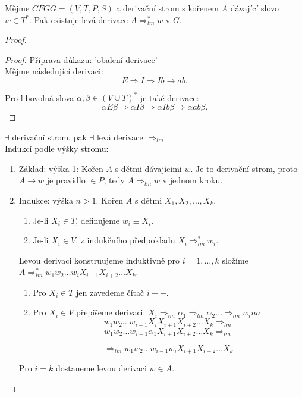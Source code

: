 \documentclass[../main.tex]{subfiles}
\begin{document}
\begin{theorem}
    Mějme $CFG G = (V,T,P,S)$ a derivační strom s kořenem $A$ dávající slovo $w \in T^*$. Pak existuje
    levá derivace $A \Rightarrow^*_{lm} w $ v $G$.

    \begin{proof}

        
        \begin{proof}
        Příprava důkazu: 'obalení derivace'\\

        Mějme následující derivaci:
        \[E \Rightarrow I \Rightarrow Ib \rightarrow ab.\]

        Pro libovolná slova $\alpha, \beta \in (V\cup T)^*$ je také derivace:
        \[\alpha E \beta \Rightarrow \alpha I \beta \Rightarrow \alpha Ib \beta \Rightarrow \alpha ab \beta.\]
        \end{proof}

        $\exists$ derivační strom, pak $\exists$ levá derivace $\Rightarrow_{lm}$\\

        Indukcí podle výšky stromu:
        \begin{enumerate}
            \item Základ: výška 1: Kořen $A$ s dětmi dávajícimi $w$. Je to derivační strom, proto
            $A \rightarrow w$ je pravidlo $\in P$, tedy $A \Rightarrow_{lm} w$ v jednom kroku.
            \item Indukce: výška $n > 1$. Kořen $A$ s dětmi $X_1,X_2,\dots,X_k$.
            \begin{enumerate}
                \item Je-li $X_i \in T$, definujeme $w_i \equiv X_i$.
                \item Je-li $X_i \in V$, z indukčního předpokladu $X_i \Rightarrow^*_{lm}w_i$.
            \end{enumerate}

            Levou derivaci konstruujeme induktivně pro $i = 1,\dots,k$ složíme $A \Rightarrow^*_{lm}w_1w_2 \dots w_i X_{i+1}X_{i+2}\dots X_k$.
            \begin{enumerate}
                \item Pro $X_i \in T$ jen zavedeme čítač $i + +$.
                \item Pro $X_i \in V$ přepíšeme derivaci: $X_i\Rightarrow_{lm} \alpha_1 \Rightarrow_{lm} \alpha_2\dots \Rightarrow_{lm}w_i na$
                \[w_1w_2\dots w_{i-1}X_iX_{i+1}X_{i+2}\dots X_k \Rightarrow_{lm}\]
                \[w_1w_2\dots w_{i-1}\alpha_1X_{i+1}X_{i+2}\dots X_k \Rightarrow_{lm}\]


                \[\Rightarrow_{lm} w_1w_2\dots w_{i-1}w_i X_{i+1}X_{i+2}\dots X_k\]                
            \end{enumerate}

            Pro $i = k$ dostaneme levou derivaci $w \in A$.
        \end{enumerate}
    \end{proof}
\end{theorem}
\end{document}

